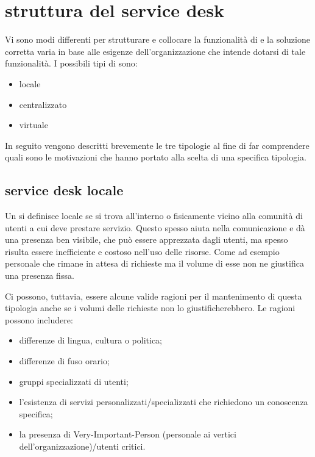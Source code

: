 %
%
\section[Struttura del Service Desk]{struttura del service desk}
\label{sd-structure}
Vi sono modi differenti per strutturare e collocare la funzionalità di  e la soluzione corretta varia in base alle esigenze dell'organizzazione che intende dotarsi di tale funzionalità. I possibili tipi di  sono:

\begin{itemize}
\item{locale}
\item{centralizzato}
\item{virtuale}
\end{itemize}

In seguito vengono descritti brevemente le tre tipologie al fine di far comprendere quali sono le motivazioni che hanno portato alla scelta di una specifica tipologia.

\subsection[Service Desk Locale]{service desk locale}
\label{sd-local-sd}
Un  si definisce locale se si trova all'interno o fisicamente vicino alla comunità di utenti a cui deve prestare servizio. Questo spesso aiuta nella comunicazione e dà una presenza ben visibile, che può essere apprezzata dagli utenti, ma spesso risulta essere inefficiente e costoso nell'uso delle risorse. Come ad esempio personale che rimane in attesa di richieste ma il volume di esse non ne giustifica una presenza fissa.

Ci possono, tuttavia, essere alcune valide ragioni per il mantenimento di questa tipologia anche se i volumi delle richieste non lo giustificherebbero. Le ragioni possono includere:

\begin{itemize}
\item{differenze di lingua, cultura o politica;}
\item{differenze di fuso orario;}
\item{gruppi specializzati di utenti;}
\item{l'esistenza di servizi personalizzati/specializzati che richiedono un conoscenza specifica;}
\item{la presenza di \acs{Very-Important-Person} (personale ai vertici dell'organizzazione)/utenti critici.}
\end{itemize}

